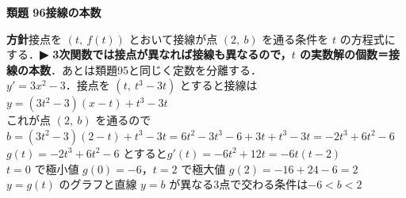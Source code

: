 \documentclass[a4paper,11pt]{ltjsarticle}
\newcommand{\ans}[2]{\Needspace{5\baselineskip}\vspace{6pt}%
  {\sffamily\bfseries 類題 #1\quad #2}\par}
\newcommand{\point}[1]{\textsf{\bfseries ▶ #1}}
\newcommand{\ax}[4]{\draw[->] (#1,0)--(#2,0) node[right]{\scriptsize $x$};
  \draw[->] (0,#3)--(0,#4) node[above]{\scriptsize $y$};
  \node[below left] at (0,0){\scriptsize O};}
\begin{document}
\ans{96}{接線の本数}
\begin{kai}
\textbf{方針}\quad 接点を $(t,\ f(t))$ とおいて接線が点 $(2,\ b)$ を通る条件を $t$ の方程式にする．\point{3次関数では接点が異なれば接線も異なるので，$t$ の実数解の個数＝接線の本数}．あとは類題95と同じく定数を分離する．\\[2pt]
$y'=3x^2-3$．接点を $(t,\ t^3-3t)$ とすると接線は\\
\hspace*{1.5em}$y=(3t^2-3)(x-t)+t^3-3t$\\
これが点 $(2,\ b)$ を通るので\\
\hspace*{1.5em}$b=(3t^2-3)(2-t)+t^3-3t=6t^2-3t^3-6+3t+t^3-3t=-2t^3+6t^2-6$\\[2pt]
$g(t)=-2t^3+6t^2-6$ とすると\quad $g'(t)=-6t^2+12t=-6t(t-2)$\\
\hspace*{1.5em}$t=0$ で極小値 $g(0)=-6$，\quad $t=2$ で極大値 $g(2)=-16+24-6=2$\\[2pt]
$y=g(t)$ のグラフと直線 $y=b$ が異なる3点で交わる条件は\quad $-6<b<2$
\begin{center}
\end{center}
\end{kai}
\end{document}
